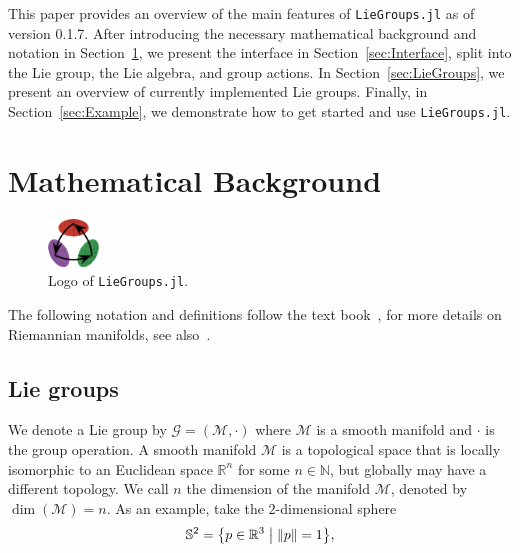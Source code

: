 \documentclass{juliacon}
\newcommand{\LieGroupsVersion}{0.1.7}
\begin{document}
This paper provides an overview of the main features of \verb|LieGroups.jl| as of version \LieGroupsVersion{}.
After introducing the necessary mathematical background and notation in Section~\ref{sec:Notation},
we present the interface in Section~\ref{sec:Interface}, split into the Lie group, the Lie algebra, and group actions.
In Section~\ref{sec:LieGroups}, we present an overview of currently implemented Lie groups.
Finally, in Section~\ref{sec:Example}, we demonstrate how to get started and use \verb|LieGroups.jl|.

\section{Mathematical Background}%
\label{sec:Notation}

\begin{figure}
    \centering
    \includegraphics[width=0.12\textwidth]{logo.png}
    \vspace{.5\baselineskip}
    \caption*{Logo of \texttt{LieGroups.jl}.}%
    \label{fig:liegroups_logo}
\end{figure}

The following notation and definitions follow the text book~\cite{HilgertNeeb:2012},
for more details on Riemannian manifolds, see also~\cite{DoCarmo:1992}.

\subsection{Lie groups}
We denote a Lie group by \(\mathcal{G} = (\mathcal{M}, \cdot)\) where \(\mathcal{M}\) is a smooth manifold and \(\cdot\) is the group operation.
A smooth manifold \(\mathcal{M}\) is a topological space that is locally isomorphic to an Euclidean space \(\mathbb{R}^n\) for some \(n \in \mathbb{N}\), but globally may have a different topology.
We call \(n\) the dimension of the manifold \(\mathcal{M}\), denoted by \(\dim(\mathcal{M}) = n\).
As an example, take the \(2\)-dimensional sphere
\begin{equation*}
\mathbb{S}^2 = \bigl\{ p \in \mathbb{R}^3 \bigm| \lVert p\rVert = 1\bigr\},
\end{equation*}
\end{document}
